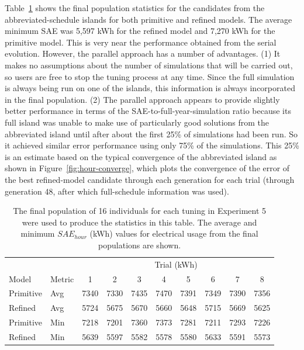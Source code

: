 \documentclass[preprint, review, 12pt]{elsarticle}
\begin{document}
Table~\ref{tab:hourly-parallel} shows the final population statistics for the candidates from the abbreviated-schedule islands for both primitive and refined models. The average minimum SAE was 5,597 kWh for the refined model and 7,270 kWh for the primitive model. This is very near the performance obtained from the serial evolution. However, the parallel approach has a number of advantages. (1) It makes no assumptions about the number of simulations that will be carried out, so users are free to stop the tuning process at any time. Since the full simulation is always being run on one of the islands, this information is always incorporated in the final population. (2) The parallel approach appears to provide slightly better performance in terms of the SAE-to-full-year-simulation ratio because its full island was unable to make use of particularly good solutions from the abbreviated island until after about the first 25\% of simulations had been run. So it achieved similar error performance using only 75\% of the simulations. This 25\% is an estimate based on the typical convergence of the abbreviated island as shown in Figure~\ref{fig:hour-converge}, which plots the convergence of the error of the best refined-model candidate through each generation for each trial (through generation 48, after which full-schedule information was used).

\begin{table}[htbp]
\centering
\caption{The final population of 16 individuals for each tuning in Experiment 5 were used to produce the statistics in this table. The average and minimum $SAE_{hour}$ (kWh) values for electrical usage from the final populations are shown.}
\label{tab:hourly-parallel}
\begin{tabular}{llcccccccc}
\toprule
 &  & \multicolumn{8}{c}{Trial (kWh)}\\
Model & Metric & 1 & 2 & 3 & 4 & 5 & 6 & 7 & 8\\
\midrule
Primitive & Avg & 7340 & 7330 & 7435 & 7470 & 7391 & 7349 & 7390 & 7356\\\rowcolor{DarkRow}
Refined   & Avg & 5724 & 5675 & 5670 & 5660 & 5648 & 5715 & 5669 & 5625\\
Primitive & Min & 7218 & 7201 & 7360 & 7373 & 7281 & 7211 & 7293 & 7226\\\rowcolor{DarkRow}
Refined   & Min & 5639 & 5597 & 5582 & 5578 & 5580 & 5633 & 5591 & 5573\\
\bottomrule
\end{tabular}
\end{table}
\end{document}
